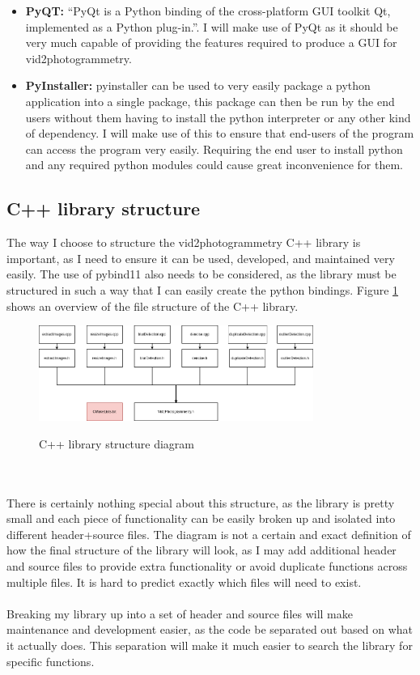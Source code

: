 \documentclass[11pt]{report}
\begin{document}
\begin{itemize}
\item \textbf{PyQT:} ``PyQt is a Python binding of the cross-platform GUI toolkit Qt, implemented as a Python plug-in.''. I will make use of PyQt as it should be very much capable of providing the features required to produce a GUI for vid2photogrammetry.
\item \textbf{PyInstaller:} pyinstaller can be used to very easily package a python application into a single package, this package can then be run by the end users without them having to install the python interpreter or any other kind of dependency. I will make use of this to ensure that end-users of the program can access the program very easily. Requiring the end user to install python and any required python modules could cause great inconvenience for them.
\end{itemize}
\subsection{C++ library structure}
The way I choose to structure the vid2photogrammetry C++ library is important, as I need to ensure it can be used, developed, and maintained very easily. The use of pybind11 also needs to be considered, as the library must be structured in such a way that I can easily create the python bindings. Figure \ref{fig:libraryStructure} shows an overview of the file structure of the C++ library.
\begin{figure}[h!]
	\centering
	\caption{C++ library structure diagram}
	\includegraphics[width=0.8\textwidth]{designDiagrams/libraryStructure}
	\label{fig:libraryStructure}
\end{figure}\\\\
There is certainly nothing special about this structure, as the library is pretty small and each piece of functionality can be easily broken up and isolated into different header+source files. The diagram is not a certain and exact definition of how the final structure of the library will look, as I may add additional header and source files to provide extra functionality or avoid duplicate functions across multiple files. It is hard to predict exactly which files will need to exist.\\\\
Breaking my library up into a set of header and source files will make maintenance and development easier, as the code be separated out based on what it actually does. This separation will make it much easier to search the library for specific functions.
\end{document}
